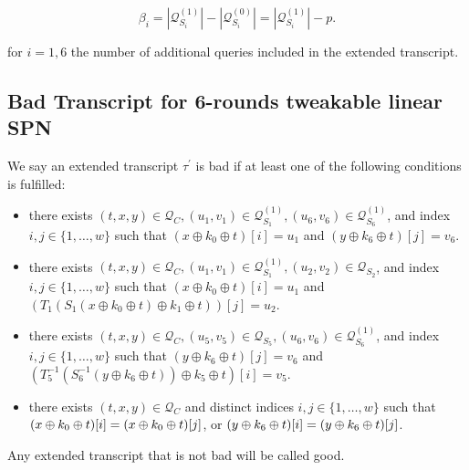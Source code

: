$$
\beta_{i}=\left|\mathcal{Q}_{S_{i}}^{(1)}\right|-\left|\mathcal{Q}_{S_{i}}^{(0)}\right|=\left|\mathcal{Q}_{S_{i}}^{(1)}\right|-p.
$$

for $i=1, 6$ the number of additional queries included in the extended transcript.



\subsection{Bad Transcript for 6-rounds tweakable linear SPN}



\begin{definition}
	\label{defn:bad-tau-6-rounds}
	
	We say an extended transcript $\tau^{\prime}$ is bad if at least one of the following conditions is fulfilled:
	\begin{itemize}
		\item[\bone] there exists $(t, x, y) \in \mathcal{Q}_{C}, \left(u_{1}, v_{1}\right) \in \mathcal{Q}_{S_{1}}^{(1)}, \left(u_{6}, v_{6}\right) \in \mathcal{Q}_{S_{6}}^{(1)}$, and index $i, j \in \{1, \ldots, w\}$ such that $\left(x \oplus k_{0} \oplus t\right)[i]=u_1$ and $\left(y \oplus k_{6} \oplus t\right)[j]=v_6$.
		\item[\btwo] there exists $(t, x, y) \in \mathcal{Q}_{C}, \left(u_{1}, v_{1}\right) \in \mathcal{Q}_{S_{1}}^{(1)}, \left(u_{2}, v_{2}\right) \in \mathcal{Q}_{S_{2}}$, and index $i, j \in \{1, \ldots, w\}$ such that $\left(x \oplus k_{0} \oplus t\right)[i]=u_1$ and $\left(T_{1}\left(S_{1}\left(x \oplus k_{0} \oplus t\right) \oplus k_{1} \oplus t\right)\right)[j]=u_2$.
		\item[\bthree] there exists $(t, x, y) \in \mathcal{Q}_{C}, \left(u_{5}, v_{5}\right) \in \mathcal{Q}_{S_{5}}, \left(u_{6}, v_{6}\right) \in \mathcal{Q}_{S_{6}}^{(1)}$, and index $i, j \in \{1, \ldots, w\}$ such that $\left(y \oplus k_{6} \oplus t\right)[j]=v_6$ and $\left(T_{5}^{-1}\left(S_{6}^{-1}\left(y \oplus k_{6} \oplus t\right)\right) \oplus k_{5} \oplus t\right)[i]=v_5$.
		\item[\bfour] there exists $(t, x, y) \in \mathcal{Q}_{C}$ and distinct indices $i, j \in \{1, \ldots, w\}$ such that $(x\oplus k_0 \oplus t)[i]=(x\oplus k_0 \oplus t)[j]$, or $(y\oplus k_6 \oplus t)[i]=(y\oplus k_6 \oplus t)[j]$.
	\end{itemize}
	Any extended transcript that is not bad will be called good.
\end{definition}




